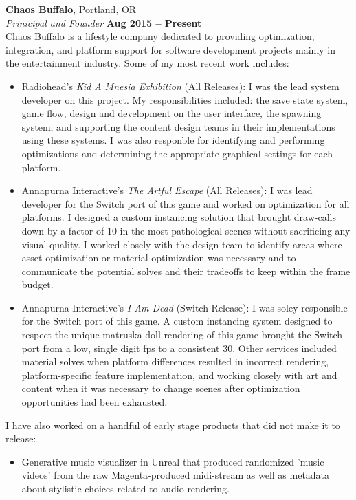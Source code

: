 \documentclass[margin,line]{resume}
\begin{document}
\begin{resume}
    \textbf{Chaos Buffalo}, Portland, OR \vspace{2mm}\\\vspace{1mm}%
    \textsl{Prinicipal and Founder} \hfill \textbf{Aug 2015 -- Present}\\
    Chaos Buffalo is a lifestyle company dedicated to providing optimization, integration, 
    and platform support for software development projects mainly in the entertainment industry. 
    Some of my most recent work includes:
\begin{itemize}
\item Radiohead's \textsl{Kid A Mnesia Exhibition} (All Releases): I was the lead system developer on this project. My responsibilities included: the save state system, game flow, design and development on the user interface, the spawning system, and supporting the content design teams in their implementations using these systems. I was also responble for identifying and performing optimizations and determining the appropriate graphical settings for each platform.
\item Annapurna Interactive's \textsl{The Artful Escape} (All Releases): I was lead developer for the Switch port of this game and worked on optimization for all platforms. I designed a custom instancing solution that  brought draw-calls down by a factor of 10 in the most pathological scenes without sacrificing any visual quality. I worked closely with the design team to identify areas where asset optimization or material optimization was necessary and to communicate the potential solves and their tradeoffs to keep within the frame budget.
\item Annapurna Interactive's \textsl{I Am Dead} (Switch Release): I was soley responsible for the Switch port of this game. A custom instancing system designed to respect the unique matruska-doll 
rendering of this game brought the Switch port from a low, single digit fps to a consistent 30. Other services included material solves when platform differences resulted in incorrect rendering, platform-specific feature implementation, and working closely with art and content when it was necessary to change scenes after optimization opportunities had been exhausted.
\end{itemize}
I have also worked on a handful of early stage products that did not make it to release:
\begin{itemize}
\item Generative music visualizer in Unreal that produced randomized 'music videos' from the raw Magenta-produced midi-stream as well as metadata about stylistic choices related to audio rendering.

\end{itemize}
\end{resume}
\end{document}
